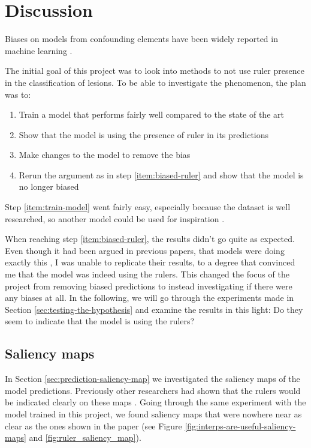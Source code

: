 \chapter{Discussion}
Biases on models from confounding elements have been widely reported in machine learning
\cite{DeConstructing_Bias_on_Skin_Lesion_Datasets_2019, Towards_Explainable_Classifiers_Using_the_Counterfactual_Approach_2019, debias-not-so-fast, interps-are-useful}.

The initial goal of this project was to look into methods to not use ruler presence in the
classification of lesions.
To be able to investigate the phenomenon, the plan was to:
\begin{enumerate}
    \item Train a model that performs fairly well compared to the state of the art \label{item:train-model}
    \item Show that the model is using the presence of ruler in its predictions \label{item:biased-ruler}
    \item Make changes to the model to remove the bias
    \item Rerun the argument as in step \ref{item:biased-ruler} and show that the model is no longer biased
\end{enumerate}
Step \ref{item:train-model} went fairly easy, especially because the dataset is well researched,
so another model could be used for inspiration \cite{kaggle-97-model}.

When reaching step \ref{item:biased-ruler}, the results didn't go quite as expected.
Even though it had been argued in previous papers, that models were doing exactly this
\cite{debias-not-so-fast,interps-are-useful}, I was unable to replicate their results,
to a degree that convinced me that the model was indeed using the rulers.
This changed the focus of the project from removing biased predictions to instead investigating
if there were any biases at all.
In the following, we will go through the experiments made in Section \ref{sec:testing-the-hypothesis} and
examine the results in this light: Do they seem to indicate that the model is using the rulers?

\section{Saliency maps}
In Section \ref{sec:prediction-saliency-map} we investigated the saliency maps of the model predictions.
Previously other researchers had shown that the rulers would be indicated clearly on these maps \cite{interps-are-useful}.
Going through the same experiment with the model trained in this project, we found saliency maps that were
nowhere near as clear as the ones shown in the paper 
(see Figure \ref{fig:interps-are-useful-saliency-maps} and \ref{fig:ruler_saliency_map}).
